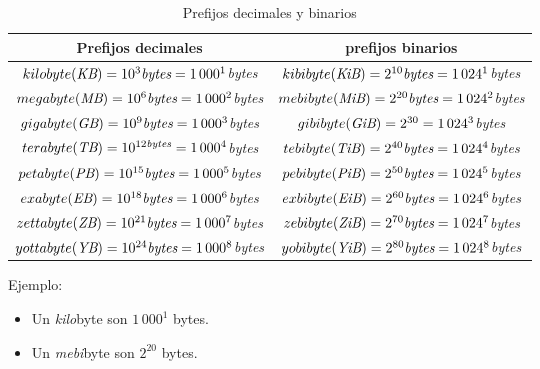 \documentclass[12pt]{article}
\begin{document}
\begin{table}[h]

    \centering

    \caption{Prefijos decimales y binarios}
    \label{tablaComparacionPrefijos}

    \begin{tabular}{ | c | c | }
        \hline
        \textbf{Prefijos decimales} &
        \textbf{prefijos binarios}\\
        \hline
        \hline
        $kilobyte(\emph{KB})=10^{3}\emph{bytes}=1\,000^{1}$\emph{bytes} &
        $kibibyte(\emph{KiB})=2^{10}\emph{bytes}=1\,024^{1}$\emph{bytes} \\
        \hline
        $megabyte(\emph{MB})=10^{6}\emph{bytes}=1\,000^{2}$\emph{bytes} &
        $mebibyte(\emph{MiB})=2^{20}\emph{bytes}=1\,024^{2}$\emph{bytes} \\
        \hline
        $gigabyte(\emph{GB})=10^{9}\emph{bytes}=1\,000^{3}$\emph{bytes} &
        $gibibyte(\emph{GiB})=2^{30}=1\,024^{3}$\emph{bytes} \\
        \hline
        $terabyte(\emph{TB})=10^{12\emph{bytes}}=1\,000^{4}$\emph{bytes} &
        $tebibyte(\emph{TiB})=2^{40}\emph{bytes}=1\,024^{4}$\emph{bytes} \\
        \hline
        $petabyte(\emph{PB})=10^{15}\emph{bytes}=1\,000^{5}$\emph{bytes} &
        $pebibyte(\emph{PiB})=2^{50}\emph{bytes}=1\,024^{5}$\emph{bytes} \\
        \hline
        $exabyte(\emph{EB})=10^{18}\emph{bytes}=1\,000^{6}$\emph{bytes} &
        $exbibyte(\emph{EiB})=2^{60}\emph{bytes}=1\,024^{6}$\emph{bytes} \\
        \hline
        $zettabyte(\emph{ZB})=10^{21}\emph{bytes}=1\,000^{7}$\emph{bytes} &
        $zebibyte(\emph{ZiB})=2^{70}\emph{bytes}=1\,024^{7}$\emph{bytes} \\
        \hline
        $yottabyte(\emph{YB})=10^{24}\emph{bytes}=1\,000^{8}$\emph{bytes} &
        $yobibyte(\emph{YiB})=2^{80}\emph{bytes}=1\,024^{8}$\emph{bytes} \\
        \hline
    \end{tabular}

    \vspace{2\topsep}
    Ejemplo:
    \vspace{-1\topsep}
    \begin{itemize}

        \itemsep2pt \parskip0pt 
        \item   Un \emph{kilo}byte son $1\,000^{1}$ bytes.
        \item   Un \emph{mebi}byte son $2^{20}$ bytes.

    \end{itemize}

\end{table}
\end{document}
